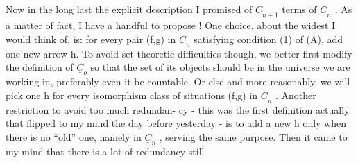   Now in the long last the explicit description I promised of $\underline{C}_{n+1}$  
terms of $\underline{C}_n$ . As a matter of fact, I have a handful to propose ! One 
choice, about the widest I would think of, is: for every pair (f,g)
in $\underline{C}_n$ satisfying condition (1) of (A), add one  new arrow h. To
avoid set-theoretic difficulties though, we better  first modify
the definition of $\underline{C}_o$ so that the set of its objects should be in the
universe we are working in, preferably even it be countable. Or else
and more reasonably, we will pick one h for every isomorphism class of
situations (f,g) in $\underline{C}_n$ . Another restriction\hand{,} to avoid too much redundan-%
cy - this was the first definition actually that flipped to my mind the
day before yesterday - is to add a \uline{new} h only when there is no ``old''
one, namely in $\underline{C}_n$ , serving the same purpose. Then it came to my mind
that there is a lot of redundancy still\hand{;} 
